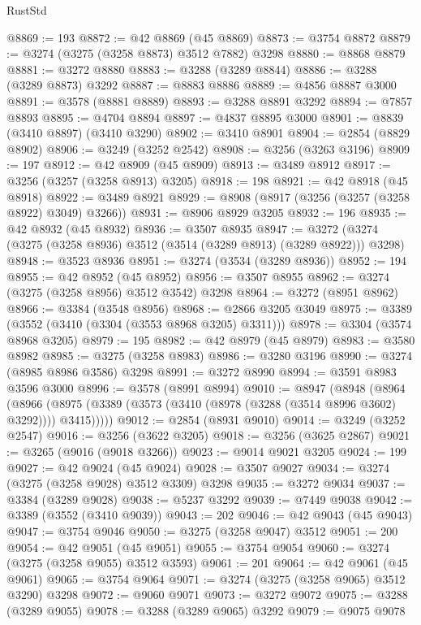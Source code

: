 \begin{lexlean}{RustStd}
\begin{coremodule}
@8869 := 193
@8872 := @42 @8869 (@45 @8869)
@8873 := @3754 @8872
@8879 := @3274 (@3275 (@3258 @8873) @3512 @7882) @3298
@8880 := @8868 @8879
@8881 := @3272 @8880
@8883 := @3288 (@3289 @8844)
@8886 := @3288 (@3289 @8873) @3292
@8887 := @8883 @8886
@8889 := @4856 @8887 @3000
@8891 := @3578 (@8881 @8889)
@8893 := @3288 @8891 @3292
@8894 := @7857 @8893
@8895 := @4704 @8894
@8897 := @4837 @8895 @3000
@8901 := @8839 (@3410 @8897) (@3410 @3290)
@8902 := @3410 @8901
@8904 := @2854 (@8829 @8902)
@8906 := @3249 (@3252 @2542)
@8908 := @3256 (@3263 @3196)
@8909 := 197
@8912 := @42 @8909 (@45 @8909)
@8913 := @3489 @8912
@8917 := @3256 (@3257 (@3258 @8913) @3205)
@8918 := 198
@8921 := @42 @8918 (@45 @8918)
@8922 := @3489 @8921
@8929 := @8908 (@8917 (@3256 (@3257 (@3258 @8922) @3049) @3266))
@8931 := @8906 @8929 @3205
@8932 := 196
@8935 := @42 @8932 (@45 @8932)
@8936 := @3507 @8935
@8947 := @3272 (@3274 (@3275 (@3258 @8936) @3512 (@3514 (@3289 @8913) (@3289 @8922))) @3298)
@8948 := @3523 @8936
@8951 := @3274 (@3534 (@3289 @8936))
@8952 := 194
@8955 := @42 @8952 (@45 @8952)
@8956 := @3507 @8955
@8962 := @3274 (@3275 (@3258 @8956) @3512 @3542) @3298
@8964 := @3272 (@8951 @8962)
@8966 := @3384 (@3548 @8956)
@8968 := @2866 @3205 @3049
@8975 := @3389 (@3552 (@3410 (@3304 (@3553 @8968 @3205) @3311)))
@8978 := @3304 (@3574 @8968 @3205)
@8979 := 195
@8982 := @42 @8979 (@45 @8979)
@8983 := @3580 @8982
@8985 := @3275 (@3258 @8983)
@8986 := @3280 @3196
@8990 := @3274 (@8985 @8986 @3586) @3298
@8991 := @3272 @8990
@8994 := @3591 @8983 @3596 @3000
@8996 := @3578 (@8991 @8994)
@9010 := @8947
    (@8948
      (@8964
        (@8966 (@8975 (@3389 (@3573 (@3410 (@8978 (@3288 (@3514 @8996 @3602) @3292)))) @3415)))))
@9012 := @2854 (@8931 @9010)
@9014 := @3249 (@3252 @2547)
@9016 := @3256 (@3622 @3205)
@9018 := @3256 (@3625 @2867)
@9021 := @3265 (@9016 (@9018 @3266))
@9023 := @9014 @9021 @3205
@9024 := 199
@9027 := @42 @9024 (@45 @9024)
@9028 := @3507 @9027
@9034 := @3274 (@3275 (@3258 @9028) @3512 @3309) @3298
@9035 := @3272 @9034
@9037 := @3384 (@3289 @9028)
@9038 := @5237 @3292
@9039 := @7449 @9038
@9042 := @3389 (@3552 (@3410 @9039))
@9043 := 202
@9046 := @42 @9043 (@45 @9043)
@9047 := @3754 @9046
@9050 := @3275 (@3258 @9047) @3512
@9051 := 200
@9054 := @42 @9051 (@45 @9051)
@9055 := @3754 @9054
@9060 := @3274 (@3275 (@3258 @9055) @3512 @3593)
@9061 := 201
@9064 := @42 @9061 (@45 @9061)
@9065 := @3754 @9064
@9071 := @3274 (@3275 (@3258 @9065) @3512 @3290) @3298
@9072 := @9060 @9071
@9073 := @3272 @9072
@9075 := @3288 (@3289 @9055)
@9078 := @3288 (@3289 @9065) @3292
@9079 := @9075 @9078

\end{coremodule}
\end{lexlean}
